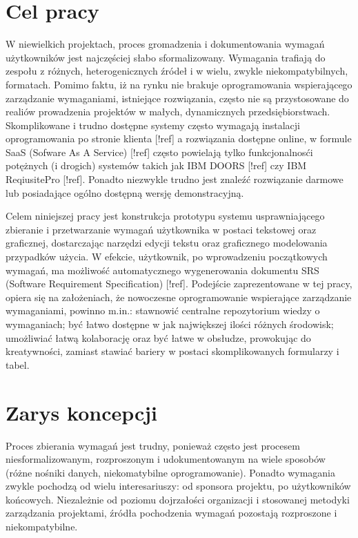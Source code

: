     \section{Cel pracy}

      W niewielkich projektach, proces gromadzenia i dokumentowania wymagań użytkowników jest najczęściej słabo sformalizowany. Wymagania trafiają do zespołu z różnych, heterogenicznych źródeł i w wielu, zwykle niekompatybilnych, formatach. Pomimo faktu, iż na rynku nie brakuje oprogramowania wspierającego zarządzanie wymaganiami, istniejące rozwiązania, często nie są przystosowane do realiów prowadzenia projektów w małych, dynamicznych przedsiębiorstwach. Skomplikowane i trudno dostępne systemy często wymagają instalacji oprogramowania po stronie klienta [!ref] a rozwiązania dostępne online, w formule SaaS (Sofware As A Service) [!ref] często powielają tylko funkcjonalnosći potężnych (i drogich) systemów takich jak IBM DOORS [!ref] czy IBM ReqiusitePro [!ref]. Ponadto niezwykle trudno jest znaleźć rozwiązanie darmowe lub posiadające ogólno dostępną wersję demonstracyjną. 

      Celem niniejszej pracy jest konstrukcja prototypu systemu usprawniającego zbieranie i przetwarzanie wymagań użytkownika w postaci tekstowej oraz graficznej, dostarczając narzędzi edycji tekstu oraz graficznego modelowania przypadków użycia. W efekcie, użytkownik, po wprowadzeniu początkowych wymagań, ma możliwość automatycznego wygenerowania dokumentu SRS (Software Requirement Specification) [!ref]. Podejście zaprezentowane w tej pracy, opiera się na założeniach, że nowoczesne oprogramowanie wspierające zarządzanie wymaganiami, powinno m.in.: stawnowić centralne repozytorium wiedzy o wymaganiach; być łatwo dostępne w jak największej ilości różnych środowisk; umożliwiać łatwą kolaborację oraz być łatwe w obsłudze, prowokując do kreatywności, zamiast stawiać bariery w postaci skomplikowanych formularzy i tabel. 


    \section{Zarys koncepcji}

      Proces zbierania wymagań jest trudny, ponieważ często jest procesem niesformalizowanym, rozproszonym i udokumentowanym na wiele sposobów (różne nośniki danych, niekomatybilne oprogramowanie). Ponadto wymagania zwykle pochodzą od wielu interesariuszy: od sponsora projektu, po użytkowników końcowych. Niezależnie od poziomu dojrzałości organizacji i stosowanej metodyki zarządzania projektami, źródła pochodzenia wymagań pozostają rozproszone i niekompatybilne. 

